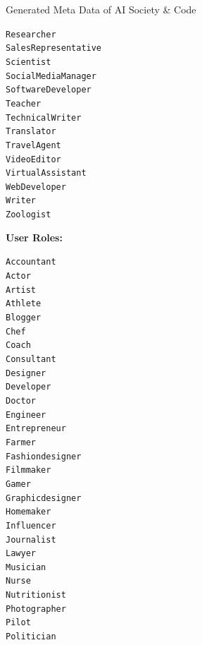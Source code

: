 \begin{figure}[h]
\begin{AIBox}{Generated Meta Data of AI Society \& Code}
{{{\begin{alltt}
						Researcher \\
						Sales Representative \\
						Scientist \\
						Social Media Manager \\
						Software Developer \\
						Teacher \\
						Technical Writer \\
						Translator \\
						Travel Agent \\
						Video Editor \\
						Virtual Assistant \\
						Web Developer \\
						Writer \\
						Zoologist
					\end{alltt}}%
				\parbox[t][][t]{0.22\textwidth}{{\small \bf User Roles:} \scriptsize\begin{alltt}
						Accountant \\
						Actor \\
						Artist \\
						Athlete \\
						Blogger \\
						Chef \\
						Coach \\
						Consultant \\
						Designer \\
						Developer \\
						Doctor \\
						Engineer \\
						Entrepreneur \\
						Farmer \\
						Fashion designer \\
						Filmmaker \\
						Gamer \\
						Graphic designer \\
						Homemaker \\
						Influencer \\
						Journalist \\
						Lawyer \\
						Musician \\
						Nurse \\
						Nutritionist \\
						Photographer \\
						Pilot \\
						Politician \\

\end{alltt}}}}
\end{AIBox}
\end{figure}
